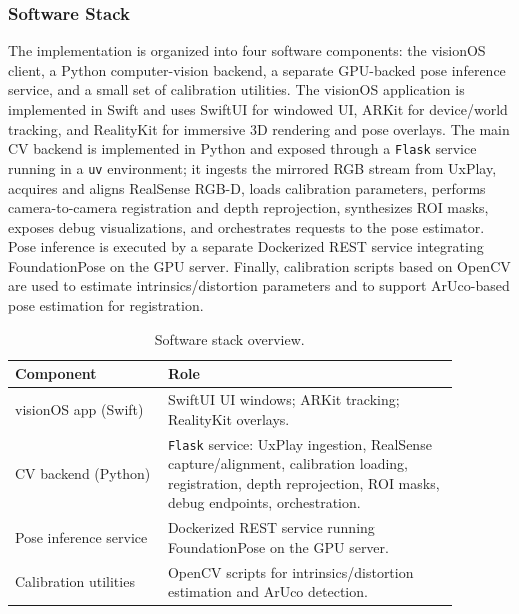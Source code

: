 \subsubsection{Software Stack}
The implementation is organized into four software components: the visionOS client, a Python computer-vision backend, a separate GPU-backed pose inference service, and a small set of calibration utilities. The visionOS application is implemented in Swift and uses SwiftUI for windowed UI, ARKit for device/world tracking, and RealityKit for immersive 3D rendering and pose overlays. The main CV backend is implemented in Python and exposed through a \texttt{Flask} service running in a \texttt{uv} environment; it ingests the mirrored RGB stream from UxPlay, acquires and aligns RealSense RGB-D, loads calibration parameters, performs camera-to-camera registration and depth reprojection, synthesizes ROI masks, exposes debug visualizations, and orchestrates requests to the pose estimator. Pose inference is executed by a separate Dockerized REST service integrating FoundationPose on the GPU server. Finally, calibration scripts based on OpenCV are used to estimate intrinsics/distortion parameters and to support ArUco-based pose estimation for registration.

\begin{table}[H]
    \centering
    \caption[Software stack overview]{Software stack overview.}
    \label{tab:sw_stack_impl}
    \begin{tabular}{p{0.30\linewidth}p{0.58\linewidth}}
        \toprule
        \textbf{Component} & \textbf{Role} \\
        \midrule
        visionOS app (Swift) & SwiftUI UI windows; ARKit tracking; RealityKit overlays. \\
        CV backend (Python) & \texttt{Flask} service: UxPlay ingestion, RealSense capture/alignment, calibration loading, registration, depth reprojection, ROI masks, debug endpoints, orchestration. \\
        Pose inference service & Dockerized REST service running FoundationPose on the GPU server. \\
        Calibration utilities & OpenCV scripts for intrinsics/distortion estimation and ArUco detection. \\
        \bottomrule
    \end{tabular}
\end{table}

